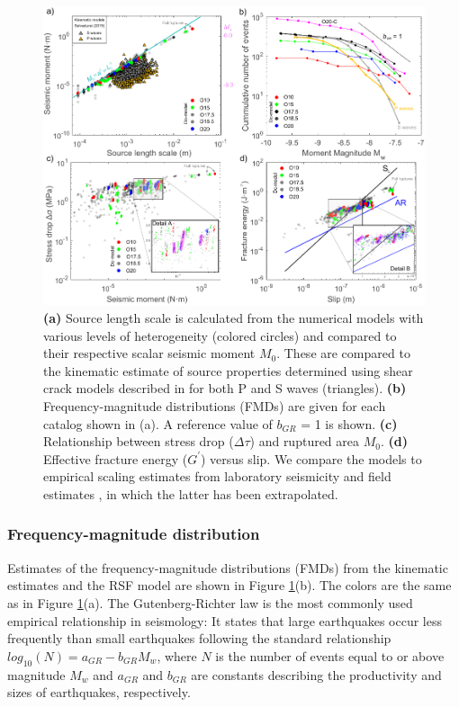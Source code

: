\documentclass[preprint,1p, 10pt,authoryear]{elsarticle}
\begin{document}
\begin{figure}
	\centering
	\includegraphics[scale = 0.95]{FIG10_revised.pdf} 
	\caption{\textbf{(a)} Source length scale is calculated from the numerical models with various levels of heterogeneity (colored circles) and compared to their respective scalar seismic moment $M_{0}$. These are compared to the kinematic estimate of source properties determined using shear crack models described in \citet{Selvadurai2019} for both P and S waves (triangles). \textbf{(b)} Frequency-magnitude distributions (FMDs) are given for each catalog shown in (a). A reference value of  $b_{GR}$ = 1 is shown. \textbf{(c)} Relationship between stress drop ($\Delta\tau$) and ruptured area $M_{0}$. \textbf{(d)} Effective fracture energy ($G^{'}$) versus slip. We compare the models to empirical scaling estimates from laboratory seismicity \citep[black line,][]{Selvadurai2019} and field estimates \citep[blue line][]{Abercrombie2005}, in which the latter has been extrapolated.}
	\label{fig10}
\end{figure}

\subsubsection{Frequency-magnitude distribution}
Estimates of the frequency-magnitude distributions (FMDs) from the kinematic estimates and the RSF model are shown in Figure \ref{fig10}(b). The colors are the same as in Figure \ref{fig10}(a).  The Gutenberg-Richter \citep{Gutenberg1944} law is the most commonly used empirical relationship in seismology:  It states that large earthquakes occur less frequently than small earthquakes following the standard relationship $log_{10}(N)= a_{GR} - b_{GR}M_{w}$, where $N$ is the number of events equal to or above magnitude $M_{w}$ and $a_{GR}$ and $b_{GR}$ are constants describing the productivity and sizes of earthquakes, respectively\cite[e.g.][]{Wiemer2002}.  
\end{document}
